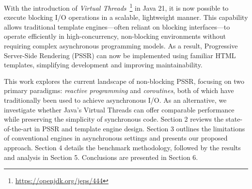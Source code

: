 With the introduction of \textit{Virtual Threads}~\footnote{\url{https://openjdk.org/jeps/444}}
in Java 21, it is now possible to execute blocking I/O operations in a
scalable, lightweight manner. This capability allows traditional template
engines—often reliant on blocking interfaces—to operate efficiently in
high-concurrency, non-blocking environments without requiring complex
asynchronous programming models. As a result, Progressive Server-Side Rendering
(PSSR) can now be implemented using familiar HTML templates, 
simplifying development and improving maintainability.

This work explores the current landscape of non-blocking PSSR, focusing on two
primary paradigms: \textit{reactive programming} and \textit{coroutines}, both
of which have traditionally been used to achieve asynchronous I/O. As an
alternative, we investigate whether Java’s Virtual Threads can offer comparable
performance while preserving the simplicity of synchronous code. Section 2
reviews the state-of-the-art in PSSR and template engine design. Section 3
outlines the limitations of conventional engines in asynchronous settings and
presents our proposed approach. Section 4 details the benchmark methodology,
followed by the results and analysis in Section 5. Conclusions are presented in Section 6.
